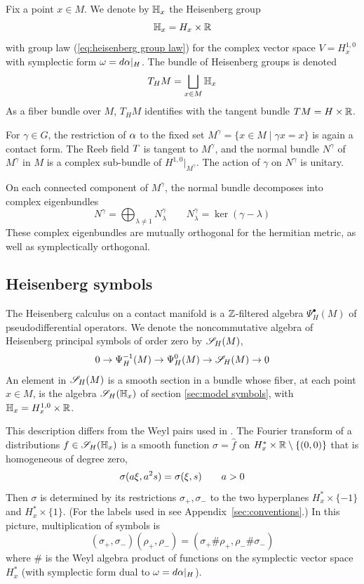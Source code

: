 \documentclass[11pt]{amsart}
\theoremstyle{plain}
\theoremstyle{definition}
\theoremstyle{remark}
\begin{document}
Fix a point $x\in M$. We denote by $\mathbb{H}_x$ the Heisenberg group \[\mathbb{H}_x=H_x\times {\mathbb{R}}\]
with group law (\ref{eq:heisenberg group law}) for the complex vector space $V=H_x^{1,0}$ with symplectic form $\omega=d\alpha|_H$.
The bundle of Heisenberg groups is denoted
\[ T_HM=\bigsqcup_{x\in M} \mathbb{H}_x\]
As a fiber bundle over $M$, $T_HM$ identifies with the tangent bundle $TM=H\times {\mathbb{R}}$.

For $\gamma\in G$, the restriction of $\alpha$ to the fixed set $M^\gamma=\{x\in M\mid \gamma x=x\}$ is again a contact form.
The Reeb field $T$ is tangent to $M^\gamma$, and the normal bundle $N^\gamma$ of $M^\gamma$ in $M$ is a complex sub-bundle of $H^{1,0}|_{M^\gamma}$.
The action of $\gamma$ on $N^\gamma$ is unitary.

On each connected component of $M^\gamma$, the normal bundle decomposes into complex eigenbundles
\[ N^\gamma = \bigoplus_{\lambda\ne 1} N^\gamma_\lambda\qquad N_\lambda^\gamma=\ker (\gamma - \lambda)\]
These complex eigenbundles are mutually orthogonal for the hermitian metric, as well as symplectically orthogonal.

\subsection{Heisenberg symbols}\label{sec:Hsymb}
The Heisenberg calculus on a contact manifold is a ${\mathbb{Z}}$-filtered algebra $\Psi^\bullet_H(M)$ of pseudodifferential operators.
We denote the noncommutative algebra of Heisenberg principal symbols of order zero by ${\mathscr{S}_H}(M)$,
\[ 0\to \Psi_H^{-1}(M)\to \Psi_H^0(M)\to  {\mathscr{S}_H}(M)\to 0\]
An element in ${\mathscr{S}_H}(M)$ is a smooth section in a bundle whose fiber, at each point $x\in M$,
is the algebra ${\mathscr{S}_H}(\mathbb{H}_x)$ of section \ref{sec:model symbols}, with $\mathbb{H}_x=H^{1,0}_x\times {\mathbb{R}}$.

This description differs from the Weyl pairs used in \cite{GvE20}.
The Fourier transform of a distributions $f\in{\mathscr{S}_H}(\mathbb{H}_x)$
is a smooth function $\sigma=\hat f$ on $H^*_x\times {\mathbb{R}}\setminus \{(0,0)\}$ that is homogeneous of degree zero,
\[ \sigma(a\xi,a^2s) = \sigma(\xi,s)\qquad a>0\]
Then $\sigma$ is determined by its restrictions $\sigma_+,\sigma_-$
to the two hyperplanes $H^*_x\times \{-1\}$ and $H_x^*\times \{1\}$.
(For the labels used in \cite{GvE25} see Appendix~\ref{sec:conventions}.)
In this picture, multiplication of symbols is
\[ (\sigma_+,\sigma_-)(\rho_+,\rho_-)=(\sigma_+\#\rho_+,\rho_-\#\sigma_-)\]
where $\#$ is the Weyl algebra product of functions on the symplectic vector space $H^*_x$ (with symplectic form dual to $\omega=d\alpha|_H$).
\end{document}
